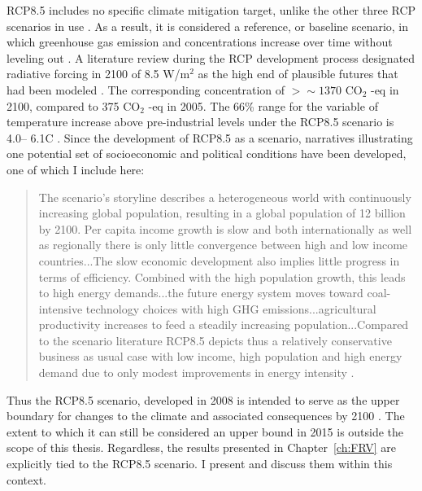 RCP8.5 includes no specific climate mitigation target, unlike the other three RCP scenarios in use \citep{Riahi2011}. As a result, it is considered a reference, or baseline scenario, in which greenhouse gas emission and concentrations increase over time without leveling out \citep{Riahi2011}. A literature review during the RCP development process designated radiative forcing in 2100 of 8.5 W/m$^2$ as the high end of plausible futures that had been modeled \citep{VanVuuren2011}. The corresponding concentration of $> \sim1370 \text{ CO}_2$ -eq in 2100, compared to 375 $\text{CO}_2$ -eq in 2005. The 66\% range for the variable of temperature increase above pre-industrial levels under the RCP8.5 scenario is 4.0\textdegree -- 6.1\textdegree C \citep{Rogelj2012}. Since the development of RCP8.5 as a scenario, narratives illustrating one potential set of socioeconomic and political conditions have been developed, one of which I include here:
%
\begin{quote} 
The scenario’s storyline describes a heterogeneous world with continuously increasing global population, resulting in a global population of 12 billion by 2100. Per capita income growth is slow and both internationally as well as regionally there is only little convergence between high and low income countries...The slow economic development also implies little progress in terms of efficiency. Combined with the high population growth, this leads to high energy demands...the future energy system moves toward coal-intensive technology choices with high GHG emissions...agricultural productivity increases to feed a steadily increasing population...Compared to the scenario literature RCP8.5 depicts thus a relatively conservative business as usual case with low income, high population and high energy demand due to only modest improvements in energy intensity \citep{Riahi2011}.
\end{quote}
%
Thus the RCP8.5 scenario, developed in 2008 is intended to serve as the upper boundary for changes to the climate and associated consequences by 2100 \citep{Moss2008}. The extent to which it can still be considered an upper bound in 2015 is outside the scope of this thesis. Regardless, the results presented in Chapter~\ref{ch:FRV} are explicitly tied to the RCP8.5 scenario. I present and discuss them within this context.


